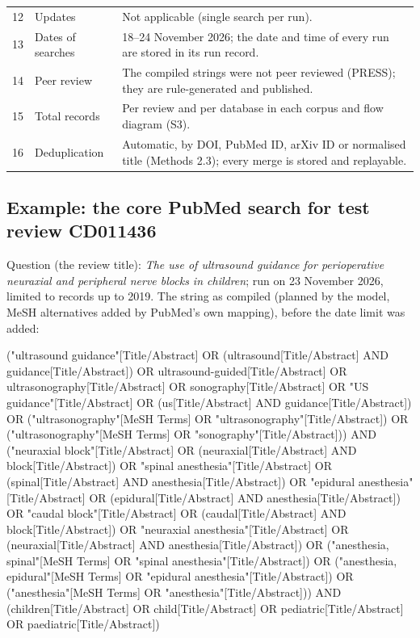 \documentclass[11pt]{article}
\begin{document}
\begin{tabularx}{\linewidth}{@{}p{0.5cm}p{3.6cm}X@{}}
12 & Updates & Not applicable (single search per run). \\
13 & Dates of searches & 18--24 November 2026; the date and time of every run are stored in its run record. \\
14 & Peer review & The compiled strings were not peer reviewed (PRESS); they are rule-generated and published. \\
15 & Total records & Per review and per database in each corpus and flow diagram (S3). \\
16 & Deduplication & Automatic, by DOI, PubMed ID, arXiv ID or normalised title (Methods 2.3); every merge is stored
and replayable. \\
\bottomrule
\end{tabularx}

\subsection*{Example: the core PubMed search for test review CD011436}

Question (the review title): \emph{The use of ultrasound guidance for perioperative neuraxial and peripheral nerve
blocks in children}; run on 23 November 2026, limited to records up to 2019. The string as compiled (planned by the
model, MeSH alternatives added by PubMed's own mapping), before the date limit was added:

\begin{flushleft}\footnotesize\ttfamily\raggedright
("ultrasound guidance"[Title/Abstract] OR (ultrasound[Title/Abstract] AND guidance[Title/Abstract]) OR ultrasound-guided[Title/Abstract] OR ultrasonography[Title/Abstract] OR sonography[Title/Abstract] OR "US guidance"[Title/Abstract] OR (us[Title/Abstract] AND guidance[Title/Abstract]) OR ("ultrasonography"[MeSH Terms] OR "ultrasonography"[Title/Abstract]) OR ("ultrasonography"[MeSH Terms] OR "sonography"[Title/Abstract])) AND ("neuraxial block"[Title/Abstract] OR (neuraxial[Title/Abstract] AND block[Title/Abstract]) OR "spinal anesthesia"[Title/Abstract] OR (spinal[Title/Abstract] AND anesthesia[Title/Abstract]) OR "epidural anesthesia"[Title/Abstract] OR (epidural[Title/Abstract] AND anesthesia[Title/Abstract]) OR "caudal block"[Title/Abstract] OR (caudal[Title/Abstract] AND block[Title/Abstract]) OR "neuraxial anesthesia"[Title/Abstract] OR (neuraxial[Title/Abstract] AND anesthesia[Title/Abstract]) OR ("anesthesia, spinal"[MeSH Terms] OR "spinal anesthesia"[Title/Abstract]) OR ("anesthesia, epidural"[MeSH Terms] OR "epidural anesthesia"[Title/Abstract]) OR ("anesthesia"[MeSH Terms] OR "anesthesia"[Title/Abstract])) AND (children[Title/Abstract] OR child[Title/Abstract] OR pediatric[Title/Abstract] OR paediatric[Title/Abstract])
\end{flushleft}
\end{document}
